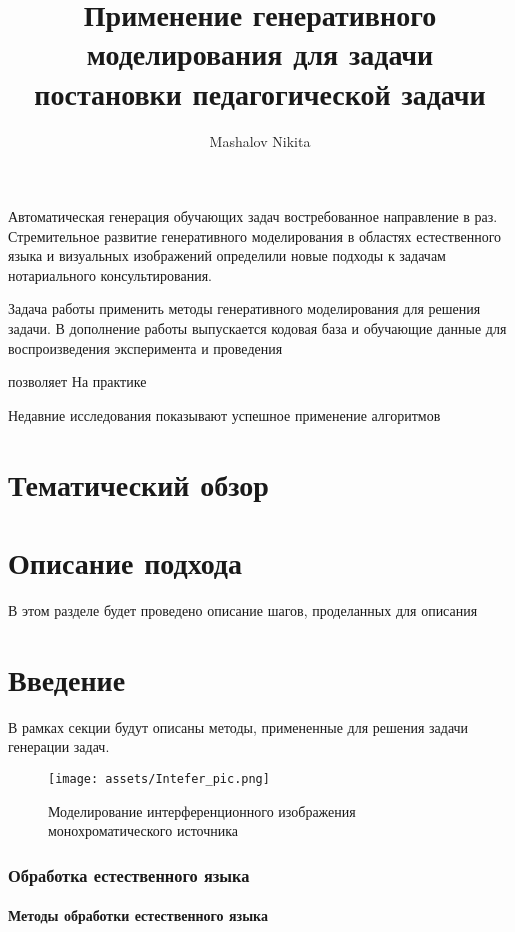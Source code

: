 \documentclass{mipt-thesis-bs}
\title{Применение генеративного моделирования для задачи постановки педагогической задачи}
\author{Mashalov Nikita}
\begin{document}
Автоматическая генерация обучающих задач востребованное
направление в раз. Стремительное развитие генеративного моделирования 
в областях естественного языка  и
визуальных изображений \cite{rombach2022highresolution}\cite{song2020generative} определили
новые подходы к задачам нотариального консультирования.

Задача работы применить методы генеративного моделирования для решения задачи. В дополнение работы 
выпускается кодовая база и обучающие данные для воспроизведения эксперимента и проведения


позволяет
На практике 


Недавние исследования показывают
успешное применение алгоритмов 

\chapter{Тематический обзор}



\chapter{Описание подхода}

В этом разделе будет проведено описание шагов, проделанных для описания


\chapter{Введение}

В рамках секции будут описаны методы, примененные для решения задачи генерации задач.


\begin{figure}[h]
    \centering
    \texttt{[image: assets/Intefer\_pic.png]}
    \caption{Моделирование интерференционного изображения монохроматического источника}
    \label{fig_NewtonRings}
\end{figure}


\subsection{Обработка естественного языка}





\subsubsection{Методы обработки естественного языка}
\end{document}
